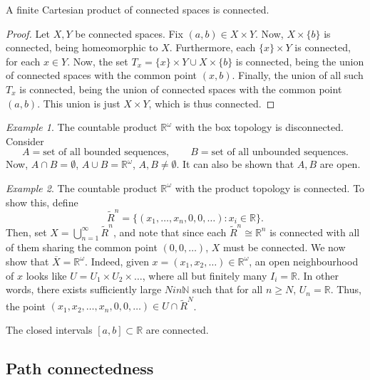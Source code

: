 \documentclass[11pt]{article}
\newcommand{\R}{\mathbb{R}}
\newcommand{\N}{\mathbb{N}}
\theoremstyle{definition}
\theoremstyle{remark}
\newtheorem*{example}{Example}
\numberwithin{equation}{section}
\begin{document}
    \begin{theorem}
        A finite Cartesian product of connected spaces is connected.
    \end{theorem}
    \begin{proof}
        Let $X, Y$ be connected spaces. Fix $(a, b) \in X \times Y$. Now, $X\times
        \{b\}$ is connected, being homeomorphic to $X$. Furthermore, each $\{x\}
        \times Y$ is connected, for each $x \in Y$. Now, the set $T_x = \{x\} \times
        Y \cup X\times \{b\}$ is connected, being the union of connected spaces with
        the common point $(x, b)$. Finally, the union of all such $T_x$ is connected,
        being the union of connected spaces with the common point $(a, b)$. This
        union is just $X\times Y$, which is thus connected.
    \end{proof}
    \begin{example}
        The countable product $\R^\omega$ with the box topology is disconnected.
        Consider \[
            A = \text{set of all bounded sequences}, \qquad
            B = \text{set of all unbounded sequences}.
        \] Now, $A \cap B = \emptyset$, $A\cup B = \R^\omega$, $A, B \neq \emptyset$.
        It can also be shown that $A, B$ are open.
    \end{example}
    \begin{example}
        The countable product $\R^\omega$ with the product topology is connected. To
        show this, define \[
            \tilde{R}^n = \{(x_1, \dots, x_n, 0, 0, \dots): x_i \in \R\}.
        \] Then, set $X = \bigcup_{n = 1}^\infty \tilde{R}^n$, and note that since
        each $\tilde{R}^n \cong \R^n$ is connected with all of them sharing the
        common point $(0, 0, \dots)$, $X$ must be connected. We now show that
        $\overline{X} = \R^\omega$. Indeed, given $x = (x_1, x_2, \dots) \in \R^\omega$,
        an open neighbourhood of $x$ looks like $U = U_1 \times U_2 \times \dots$,
        where all but finitely many $I_i = \R$. In other words, there exists
        sufficiently large $N in \N$ such that for all $n \geq N$, $U_n = \R$. Thus,
        the point $(x_1, x_2, \dots, x_n, 0, 0, \dots) \in U \cap \tilde{R}^N$.
    \end{example}

    \begin{lemma}
        The closed intervals $[a, b] \subset \R$ are connected.
    \end{lemma}

    \subsection{Path connectedness}
\end{document}
